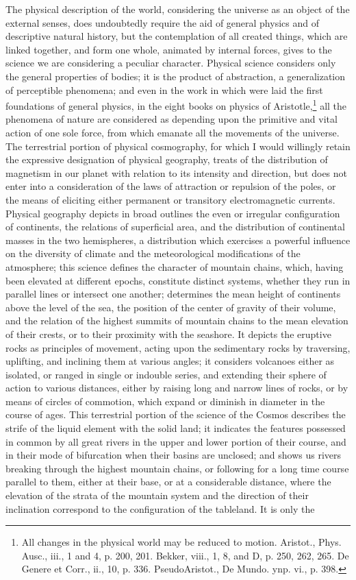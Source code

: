 The physical description of the world, considering the universe as an object of the external senses, does undoubtedly require the aid of general physics and of descriptive natural history, but the contemplation of all created things, which are linked together, and form one whole, animated by internal forces, gives to the science we are considering a peculiar character. Physical science considers only the general properties of bodies; it is the product of abstraction, a generalization of perceptible phenomena; and even in the work in which were laid the first foundations of general physics, in the eight books on physics of Aristotle,\footnote{All changes in the physical world may be reduced to motion. Aristot., Phys. Ausc., iii., 1 and 4, p. 200, 201. Bekker, viii., 1, 8, and D, p. 250, 262, 265. De Genere et Corr., ii., 10, p. 336. PseudoAristot., De Mundo. ynp. vi., p. 398.} all the phenomena of nature are considered as depending upon the primitive and vital action of one sole force, from which emanate all the movements of the universe. The terrestrial portion of physical cosmography, for which I would willingly retain the expressive designation of physical geography, treats of the distribution of magnetism in our planet with relation to its intensity and direction, but does not enter into a consideration of the laws of attraction or repulsion of the poles, or the means of eliciting either permanent or transitory electromagnetic currents. Physical geography depicts in broad outlines the even or irregular configuration of continents, the relations of superficial area, and the distribution of continental masses in the two hemispheres, a distribution which exercises a powerful influence on the diversity of climate and the meteorological modifications of the atmosphere; this science defines the character of mountain chains, which, having been elevated at different epochs, constitute distinct systems, whether they run in parallel lines or intersect one another; determines the mean height of continents above the level of the sea, the position of the center of gravity of their volume, and the relation of the highest summits of mountain chains to the mean elevation of their crests, or to their proximity with the seashore. It depicts the eruptive rocks as principles of movement, acting upon the sedimentary rocks by traversing, uplifting, and inclining them at various angles; it considers volcanoes either as isolated, or ranged in single or indouble series, and extending their sphere of action to various distances, either by raising long and narrow lines of rocks, or by means of circles of commotion, which expand or diminish in diameter in the course of ages. This terrestrial portion of the science of the Cosmos describes the strife of the liquid element with the solid land; it indicates the features possessed in common by all great rivers in the upper and lower portion of their course, and in their mode of bifurcation when their basins are unclosed; and shows us rivers breaking through the highest mountain chains, or following for a long time course parallel to them, either at their base, or at a considerable distance, where the elevation of the strata of the mountain system and the direction of their inclination correspond to the configuration of the tableland. It is only the 